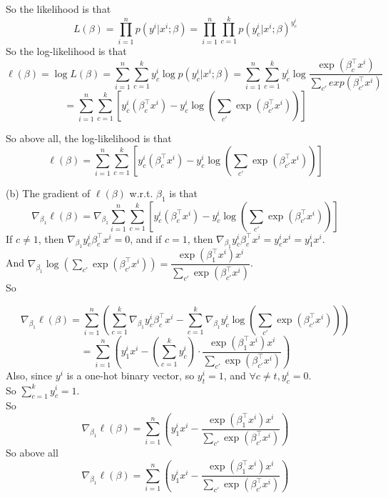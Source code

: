 So the likelihood is that
$$L(\beta)=\prod\limits_{i=1}^np(y^i|x^i;\beta)=\prod\limits_{i=1}^n\prod\limits_{c=1}^k p(y_c^i|x^i;\beta)^{y_c^i}$$
So the log-likelihood is that
$$\ell(\beta)=\log L(\beta)=\sum\limits_{i=1}^n\sum\limits_{c=1}^k y_c^i\log p(y_c^i|x^i;\beta)=\sum\limits_{i=1}^n\sum\limits_{c=1}^k y_c^i\log\dfrac{\exp(\beta_c^{\top}x^i)}{\sum\limits_{c'}exp(\beta_{c'}^{\top}x^i)}$$
$$=\sum\limits_{i=1}^n\sum\limits_{c=1}^k\left[y_c^i(\beta_c^{\top}x^i)-y_c^i\log\left(\sum\limits_{c'}\exp(\beta_{c'}^{\top}x^i)\right)\right]$$

So above all, the log-likelihood is that
$$\ell(\beta)=\sum\limits_{i=1}^n\sum\limits_{c=1}^k\left[y_c^i(\beta_c^{\top}x^i)-y_c^i\log\left(\sum\limits_{c'}\exp(\beta_{c'}^{\top}x^i)\right)\right]$$

(b) The gradient of $\ell(\beta)$ w.r.t. $\beta_1$ is that
$$\nabla_{\beta_1}\ell(\beta)=\nabla_{\beta_1}\sum\limits_{i=1}^n\sum\limits_{c=1}^k\left[y_c^i(\beta_c^{\top}x^i)-y_c^i\log\left(\sum\limits_{c'}\exp(\beta_{c'}^{\top}x^i)\right)\right]$$
If $c\neq 1$, then $\nabla_{\beta_1}y_c^i\beta_c^{\top}x^i=0$, and if $c=1$, then $\nabla_{\beta_1}y_c^i\beta_c^{\top}x^i=y_c^ix^i=y_{1}^ix^i$. \\
And $\nabla_{\beta_1}\log\left(\sum\limits_{c'}\exp(\beta_{c'}^{\top}x^i)\right)=\dfrac{\exp(\beta_1^{\top}x^i)x^i}{\sum\limits_{c'}\exp(\beta_{c'}^{\top}x^i)}$. \\
So

$$\nabla_{\beta_1}\ell(\beta)=\sum\limits_{i=1}^n\left(\sum\limits_{c=1}^k\nabla_{\beta_1}y_c^i\beta_c^{\top}x^i-\sum\limits_{c=1}^k\nabla_{\beta_1}y_c^i\log\left(\sum\limits_{c'}\exp(\beta_{c'}^{\top}x^i)\right)\right)$$
$$=\sum\limits_{i=1}^n\left(y_1^ix^i-\left(\sum\limits_{c=1}^ky_c^i\right)\cdot\dfrac{\exp(\beta_1^{\top}x^i)x^i}{\sum\limits_{c'}\exp(\beta_{c'}^{\top}x^i)}\right)$$
Also, since $y^i$ is a one-hot binary vector, so $y_t^i=1$, and $\forall c\neq t, y_{c}^i=0$. \\
So $\sum\limits_{c=1}^ky_c^i=1$. \\
So
$$\nabla_{\beta_1}\ell(\beta)=\sum\limits_{i=1}^n\left(y_1^ix^i-\dfrac{\exp(\beta_1^{\top}x^i)x^i}{\sum\limits_{c'}\exp(\beta_{c'}^{\top}x^i)}\right)$$
So above all
$$\nabla_{\beta_1}\ell(\beta)=\sum\limits_{i=1}^n\left(y_1^ix^i-\dfrac{\exp(\beta_1^{\top}x^i)x^i}{\sum\limits_{c'}\exp(\beta_{c'}^{\top}x^i)}\right)$$

\newpage